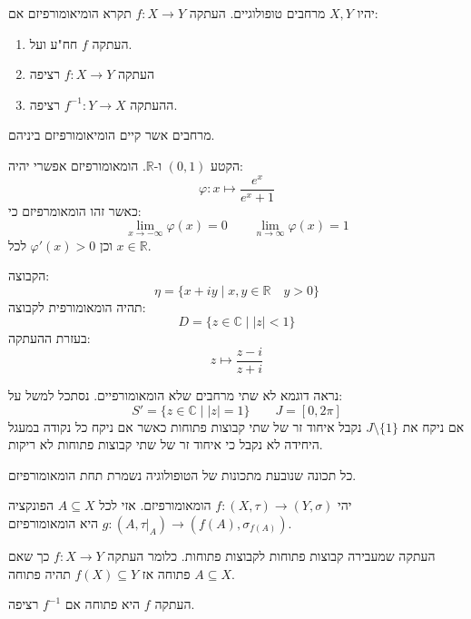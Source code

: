 \documentclass{tstextbook}
\begin{document}
\begin{definition}[הומאומורפיזם]
יהיו \(X,Y\) מרחבים טופולוגיים. העתקה \(f:X\to Y\) תקרא הומיאומורפיזם אם:

  \begin{enumerate}
    \item העתקה \(f\) חח"ע ועל. 


    \item העתקה \(f:X\to Y\) רציפה 


    \item ההעתקה \(f^{-1}:Y\to X\) רציפה. 


  \end{enumerate}
\end{definition}
\begin{definition}
מרחבים אשר קיים הומיאומורפיזם ביניהם.

\end{definition}
\begin{example}
הקטע \((0,1)\) ו-\(\mathbb{R}\). הומאומורפיזם אפשרי יהיה:
$$\varphi:x\mapsto \frac{e^{ x }}{e^{ x }+1}$$
כאשר זהו הומאומרפיזם כי:
$$\lim_{ x \to -\infty } \varphi(x)=0\qquad \lim_{ n \to \infty } \varphi(x)=1$$
וכן \(\varphi'(x)> 0\) לכל \(x \in \mathbb{R}\).

\end{example}
\begin{example}
הקבוצה:
$$\eta=\{ x+iy \mid  x,y \in \mathbb{R}\quad y> 0\}$$
תהיה הומאומורפית לקבוצה:
$$D=\{ z \in \mathbb{C}\mid  \lvert z \rvert < 1 \}$$
בעזרת ההעתקה:
$$z\mapsto \frac{z-i}{z+i}$$

\end{example}
\begin{example}
נראה דוגמא לא שתי מרחבים שלא הומאומורפיים. נסתכל למשל על:
$$S'=\{ z \in \mathbb{C}\mid \lvert z \rvert =1 \}\qquad J=[0,2\pi]$$
אם ניקח את \(J\setminus \{ 1 \}\) נקבל איחוד זר של שתי קבוצות פתוחות כאשר אם ניקח כל נקודה במעגל היחידה לא נקבל כי איחוד זר של שתי קבוצות פתוחות לא ריקות.

\end{example}
\begin{remark}
כל תכונה שנובעת מתכונות של הטופולוגיה נשמרת תחת הומאומורפיזם.

\end{remark}
\begin{proposition}
יהי \(f:(X,\tau)\to (Y,\sigma)\) הומאומורפיזם. אזי לכל \(A\subseteq X\) הפונקציה \(g:(A,\tau|_{A})\to(f(A),\sigma_{f(A)})\) היא הומאומורפיזם.

\end{proposition}
\begin{definition}
העתקה שמעבירה קבוצות פתוחות לקבוצות פתוחות. כלומר העתקה \(f:X\to Y\) כך שאם \(A\subseteq X\) פתוחה אז \(f(X)\subseteq Y\) תהיה פתוחה.

\end{definition}
\begin{proposition}
העתקה \(f\) היא פתוחה אם \(f^{-1}\) רציפה.

\end{proposition}
\end{document}
